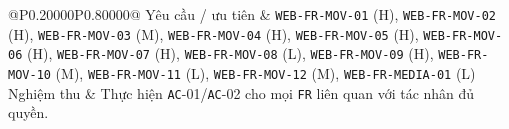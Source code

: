\begin{longtable}{@{}P{0.20000\SRSWidth}P{0.80000\SRSWidth}@{}}
Yêu cầu /\allowbreak{} ưu tiên & \texttt{WEB-\allowbreak{}FR-\allowbreak{}MOV-\allowbreak{}01} (H), \texttt{WEB-\allowbreak{}FR-\allowbreak{}MOV-\allowbreak{}02} (H), \texttt{WEB-\allowbreak{}FR-\allowbreak{}MOV-\allowbreak{}03} (M), \texttt{WEB-\allowbreak{}FR-\allowbreak{}MOV-\allowbreak{}04} (H), \texttt{WEB-\allowbreak{}FR-\allowbreak{}MOV-\allowbreak{}05} (H), \texttt{WEB-\allowbreak{}FR-\allowbreak{}MOV-\allowbreak{}06} (H), \texttt{WEB-\allowbreak{}FR-\allowbreak{}MOV-\allowbreak{}07} (H), \texttt{WEB-\allowbreak{}FR-\allowbreak{}MOV-\allowbreak{}08} (L), \texttt{WEB-\allowbreak{}FR-\allowbreak{}MOV-\allowbreak{}09} (H), \texttt{WEB-\allowbreak{}FR-\allowbreak{}MOV-\allowbreak{}10} (M), \texttt{WEB-\allowbreak{}FR-\allowbreak{}MOV-\allowbreak{}11} (L), \texttt{WEB-\allowbreak{}FR-\allowbreak{}MOV-\allowbreak{}12} (M), \texttt{WEB-\allowbreak{}FR-\allowbreak{}MEDIA-\allowbreak{}01} (L) \\[3pt]
Nghiệm thu & Thực hiện \texttt{AC}-01/\allowbreak{}\texttt{AC}-02 cho mọi \texttt{FR} liên quan với tác nhân đủ quyền. \\[3pt]
\end{longtable}
\endgroup

